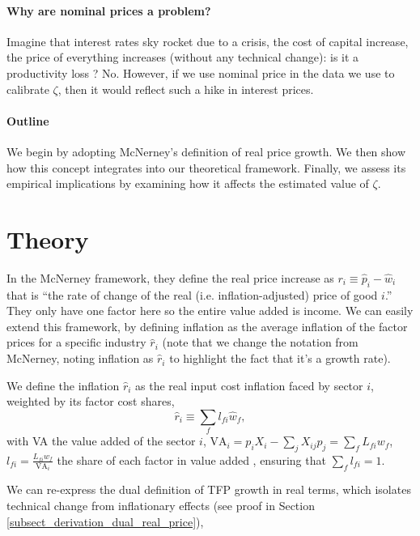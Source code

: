 \documentclass[11pt]{article}
\begin{document}
\paragraph{Why are nominal prices a problem?} Imagine that interest rates sky rocket due to a crisis, the cost of capital increase, the price of everything increases (without any technical change): is it a productivity loss ? No. However, if we use nominal price in the data we use to calibrate $\zeta$, then it would reflect such a hike in interest prices. 

\paragraph{Outline} We begin by adopting McNerney’s definition of real price growth. We then show how this concept integrates into our theoretical framework. Finally, we assess its empirical implications by examining how it affects the estimated value of $\zeta$.
\tableofcontents

\section{Theory}

 In the McNerney framework, they define the real price increase as  $r_i \equiv \hat{p}_i-\hat{w}_i$ that is ``the rate of change of the real (i.e. inflation-adjusted) price of good $i$.'' They only have one factor here so the entire value added is income. 
We can easily extend this framework, by defining inflation as the average inflation of the factor prices for a specific industry $\hat{r}_i$ (note that we change the notation from McNerney, noting inflation as $\hat{r}_i$ to highlight the fact that it's a growth rate). 


We define the inflation $\hat{r}_i$ as the real input cost inflation faced by sector $i$, weighted by its factor cost shares,
\begin{equation}
\label{eq_def_ri}
\hat{r}_i\equiv \sum_f l_{fi}\hat{w}_f,
\end{equation}
with VA the value added of the sector $i$, $\text{VA}_i=p_iX_i-\sum_j X_{ij}p_j=\sum_f L_{fi}w_f$, $l_{fi}=\frac{L_{fi}w_f}{\text{VA}_i}$ the share of each factor in value added , ensuring that $\sum_f l_{fi}=1$. 


We can re-express the dual definition of TFP growth in real terms, which isolates technical change from inflationary effects (see proof in Section \ref{subsect_derivation_dual_real_price}), 
\end{document}
